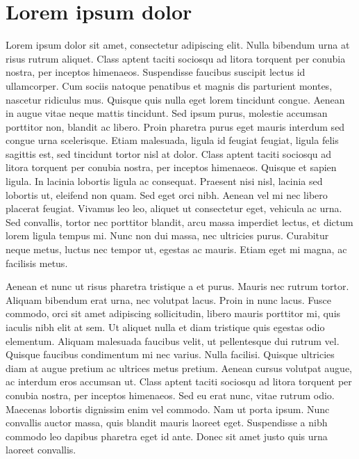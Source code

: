 \chapter{Lorem ipsum dolor}
\label{cap:fundamentos}

Lorem ipsum dolor sit amet, consectetur adipiscing elit. Nulla bibendum urna at risus rutrum aliquet. Class aptent taciti sociosqu ad litora torquent per conubia nostra, per inceptos himenaeos. Suspendisse faucibus suscipit lectus id ullamcorper. Cum sociis natoque penatibus et magnis dis parturient montes, nascetur ridiculus mus. Quisque quis nulla eget lorem tincidunt congue. Aenean in augue vitae neque mattis tincidunt. Sed ipsum purus, molestie accumsan porttitor non, blandit ac libero. Proin pharetra purus eget mauris interdum sed congue urna scelerisque. Etiam malesuada, ligula id feugiat feugiat, ligula felis sagittis est, sed tincidunt tortor nisl at dolor. Class aptent taciti sociosqu ad litora torquent per conubia nostra, per inceptos himenaeos. Quisque et sapien ligula. In lacinia lobortis ligula ac consequat. Praesent nisi nisl, lacinia sed lobortis ut, eleifend non quam. Sed eget orci nibh. Aenean vel mi nec libero placerat feugiat. Vivamus leo leo, aliquet ut consectetur eget, vehicula ac urna. Sed convallis, tortor nec porttitor blandit, arcu massa imperdiet lectus, et dictum lorem ligula tempus mi. Nunc non dui massa, nec ultricies purus. Curabitur neque metus, luctus nec tempor ut, egestas ac mauris. Etiam eget mi magna, ac facilisis metus.

Aenean et nunc ut risus pharetra tristique a et purus. Mauris nec rutrum tortor. Aliquam bibendum erat urna, nec volutpat lacus. Proin in nunc lacus. Fusce commodo, orci sit amet adipiscing sollicitudin, libero mauris porttitor mi, quis iaculis nibh elit at sem. Ut aliquet nulla et diam tristique quis egestas odio elementum. Aliquam malesuada faucibus velit, ut pellentesque dui rutrum vel. Quisque faucibus condimentum mi nec varius. Nulla facilisi. Quisque ultricies diam at augue pretium ac ultrices metus pretium. Aenean cursus volutpat augue, ac interdum eros accumsan ut. Class aptent taciti sociosqu ad litora torquent per conubia nostra, per inceptos himenaeos. Sed eu erat nunc, vitae rutrum odio. Maecenas lobortis dignissim enim vel commodo. Nam ut porta ipsum. Nunc convallis auctor massa, quis blandit mauris laoreet eget. Suspendisse a nibh commodo leo dapibus pharetra eget id ante. Donec sit amet justo quis urna laoreet convallis.

